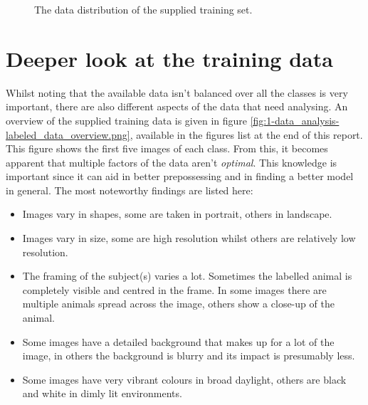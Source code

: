 \begin{figure}[H]
    \centering
    \captionsetup{width=0.7\linewidth}
    \captionsetup{justification=centering}
    \caption{The data distribution of the supplied training set.}
    \label{fig:1-data_analysis-labeled_data_distribution}
\end{figure}


\section{Deeper look at the training data}
\label{section:DA_deeper_look_data}

Whilst noting that the available data isn't balanced over all the classes is very important, there are also different aspects of the data that need analysing. 
An overview of the supplied training data is given in figure \ref{fig:1-data_analysis-labeled_data_overview.png}, available in the figures list at the end of this report.
This figure shows the first five images of each class.
From this, it becomes apparent that multiple factors of the data aren't \emph{optimal}.
This knowledge is important since it can aid in better prepossessing and in finding a better model in general.
The most noteworthy findings are listed here:
\begin{itemize}
    \item Images vary in shapes, some are taken in portrait, others in landscape.
    \item Images vary in size, some are high resolution whilst others are relatively low resolution.
    \item The framing of the subject(s) varies a lot. Sometimes the labelled animal is completely visible and centred in the frame. In some images there are multiple animals spread across the image, others show a close-up of the animal.
    \item Some images have a detailed background that makes up for a lot of the image, in others the background is blurry and its impact is presumably less.
    \item Some images have very vibrant colours in broad daylight, others are black and white in dimly lit environments.
\end{itemize}

